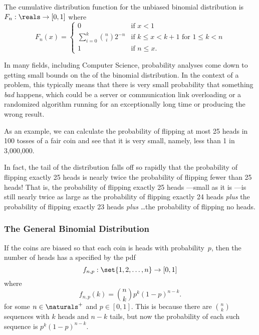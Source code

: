 The cumulative distribution function for the unbiased binomial
distribution is $F_n: \reals \to [0, 1]$ where
\begin{equation*}
F_n(x) =
    \begin{cases}
        0 & \text{if $x < 1$} \\
        \sum_{i = 0}^k \binom{n}{i} 2^{-n}
            & \text{if $k \le x < k + 1$ for $1 \le k < n$} \\
        1 & \text{if $n \le x$}.
    \end{cases}
\end{equation*}

In many fields, including Computer Science, probability analyses come down
to getting small bounds on the  of the binomial distribution.
In the context of a problem, this typically means that there is very small
probability that something \emph{bad} happens, which could be a server
or communication link overloading or a randomized algorithm running for an
exceptionally long time or producing the wrong result.

As an example, we can calculate the probability of flipping at most 25
heads in 100 tosses of a fair coin and see that it is very small, namely,
less than 1 in 3,000,000.

In fact, the tail of the distribution falls off so rapidly that the
probability of flipping exactly 25 heads is nearly twice the
probability of flipping fewer than 25 heads!  That is, the probability
of flipping exactly 25 heads ---small as it is ---is still nearly
twice as large as the probability of flipping exactly 24 heads
\emph{plus} the probability of flipping exactly 23 heads \emph{plus}
\dots the probability of flipping no heads.

\subsubsection{The General Binomial Distribution}

If the coins are biased so that each coin is heads with
probability~$p$, then the number of heads has a  specified by the pdf
\begin{equation*}
    f_{n,p} : \set{1, 2, \dots, n} \to [0, 1]
\end{equation*}
where
\[
    f_{n, p}(k) = \binom{n}{k} p^k (1-p)^{n-k}.
\]
for some $n \in \naturals^+$ and $p \in [0, 1]$.  This is because
there are $\binom{n}{k}$ sequences with $k$ heads and $n - k$ tails,
but now the probability of each such sequence is $p^k (1-p)^{n-k}$.

